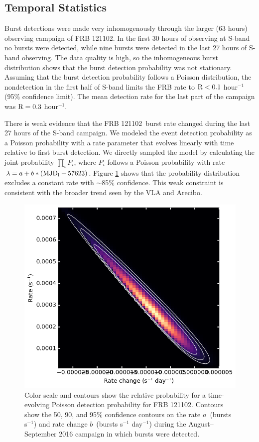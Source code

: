 \documentclass[twocolumn]{aastex61}
\newcommand{\frb}{FRB 121102}
\begin{document}
\subsection{Temporal Statistics}
Burst detections were made very inhomogenously through the larger (63 hours) observing campaign of FRB 121102. In the first 30 hours of observing at S-band no bursts were detected, while nine bursts were detected in the last 27 hours of S-band observing. The data quality is high, so the inhomogeneous burst distribution shows that the burst detection probability was not stationary. Assuming that the burst detection probability follows a Poisson distribution, the nondetection in the first half of S-band limits the FRB rate to $\rm{R}<0.1$ hour$^{-1}$ (95\% confidence limit). The mean detection rate for the last part of the campaign was $\rm{R}=0.3$ hour$^{-1}$.

There is weak evidence that the \frb\ burst rate changed during the last 27 hours of the S-band campaign. We modeled the event detection probability as a Poisson probability with a rate parameter that evolves linearly with time relative to first burst detection. We directly sampled the model by calculating the joint probability $\prod_{i} P_i$, where $P_i$ follows a Poisson probability with rate $\lambda = a + b * (\rm{MJD}_i - 57623)$. Figure \ref{fig:rate} shows that the probability distribution excludes a constant rate with $\sim$85\% confidence. This weak constraint is consistent with the broader trend seen by the VLA and Arecibo.

\begin{figure}[htb]
\begin{center}
\includegraphics[width=0.9\columnwidth]{event_rate_contours}
\caption{Color scale and contours show the relative probability for a time-evolving Poisson detection probability for \frb. Contours show the 50, 90, and 95\% confidence contours on the rate $a$\ (bursts s$^{-1}$) and rate change $b$\ (bursts s$^{-1}$ day$^{-1}$) during the August--September 2016 campaign in which bursts were detected.
\label{fig:rate}}
\end{center}
\end{figure}
\end{document}

